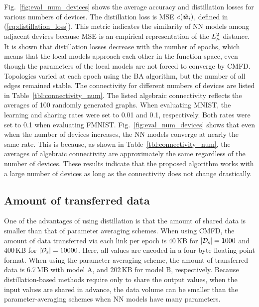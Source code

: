 \documentclass[journal]{IEEEtran}
\begin{document}
Fig.~\ref{fig:eval_num_devices} shows the average accuracy and distillation losses for various numbers of devices.
The distillation loss is \gls{MSE} $c({\hat{\bm{w}}_{i}})$, defined in (\ref{eq:distillation_loss}).
This metric indicates the similarity of \gls{NN} models among adjacent devices
because \gls{MSE} is an empirical representation of the $L^2_{\mu}$ distance.
It is shown that distillation losses decrease with the number of epochs,
which means that the local models approach each other in the function space,
even though the parameters of the local models are not forced to converge by \gls{CMFD}.
Topologies varied at each epoch using the \gls{BA} algorithm,
but the number of all edges remained stable.
The connectivity for different numbers of devices are listed in Table~\ref{tbl:connectivity_num}.
The listed algebraic connectivity reflects the averages of 100 randomly generated graphs.
When evaluating MNIST, the learning and sharing rates were set to 0.01 and 0.1, respectively.
Both rates were set to 0.1 when evaluating \gls{FMNIST}.
Fig.~\ref{fig:eval_num_devices} shows that even when the number of devices increases,
the \gls{NN} models converge at nearly the same rate.
This is because, as shown in Table~\ref{tbl:connectivity_num}, the averages of algebraic connectivity are approximately the same regardless of the number of devices.
These results indicate that the proposed algorithm works with a large number of devices
as long as the connectivity does not change drastically.

\subsection{Amount of transferred data}
One of the advantages of using distillation is that the amount of shared data is smaller than that of parameter averaging schemes.
When using \gls{CMFD}, the amount of data transferred via each link per epoch is 40\,KB for $\vert{\mathcal{D}_\mathrm{s}}\vert=1000$
and 400\,KB for $\vert{\mathcal{D}_\mathrm{s}}\vert=10000$.
Here, all values are encoded in a four-byte-floating-point format.
When using the parameter averaging scheme, the amount of transferred data is 6.7\,MB with model A,
and 202\,KB for model B, respectively.
Because distillation-based methods require only to share the output values, when the input values are shared in advance,
the data volume can be smaller than the parameter-averaging schemes when \gls{NN} models have many parameters.
\end{document}

